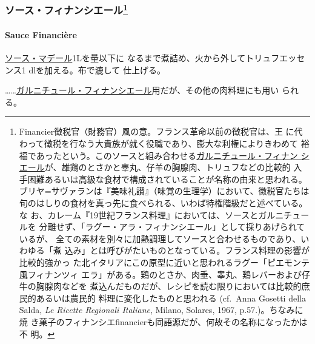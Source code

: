 \hypertarget{ux30bdux30fcux30b9ux30d5ux30a3ux30caux30f3ux30b7ux30a8ux30fcux30eb34}{%
\subsubsection[ソース・フィナンシエール]{\texorpdfstring{ソース・フィナンシエール\footnote{Financier徴税官（財務官）風の意。フランス革命以前の徴税官は、王
  に代わって徴税を行なう大貴族が就く役職であり、膨大な利権によりきわめて
  裕福であったという。このソースと組み合わせる\href{}{ガルニチュール・フィナン
  シエール}が、雄鶏のとさかと睾丸、仔羊の胸腺肉、トリュフなどの比較的
  入手困難あるいは高級な食材で構成されていることが名称の由来と思われる。
  ブリヤ=サヴァランは『美味礼讃』（味覚の生理学）において、徴税官たちは
  旬のはしりの食材を真っ先に食べられる、いわば特権階級だと述べている。な
  お、カレーム『19世紀フランス料理』においては、ソースとガルニチュールを
  分離せず、「ラグー・アラ・フィナンシエール」として採りあげられているが、
  全ての素材を別々に加熱調理してソースと合わせるものであり、いわゆる「煮
  込み」とは呼びがたいものとなっている。フランス料理の影響が比較的強かっ
  た北イタリアにこの原型に近いと思われるラグー「ピエモンテ風フィナンツィ
  エラ」がある。鶏のとさか、肉垂、睾丸、鶏レバーおよび仔牛の胸腺肉などを
  煮込んだものだが、レシピを読む限りにおいては比較的庶民的あるいは農民的
  料理に変化したものと思われる (cf.~Anna Gosetti della Salda, \emph{Le
  Ricette Regionali Italiane}, Milano, Solares, 1967, p.57.)。ちなみに焼
  き菓子のフィナンシエfinancierも同語源だが、何故その名称になったかは不
  明。}}{ソース・フィナンシエール}}\label{ux30bdux30fcux30b9ux30d5ux30a3ux30caux30f3ux30b7ux30a8ux30fcux30eb34}}

\hypertarget{sauce-financiere}{%
\paragraph{Sauce Financière}\label{sauce-financiere}}

  

\protect\hyperlink{sauce-madere}{ソース・マデール}1\unquart{}Lを\troisquarts{}量以下に
なるまで煮詰め、火から外してトリュフエッセンス1 dlを加える。布で漉して
仕上げる。

\ldots{}\ldots{}\href{}{ガルニチュール・フィナンシエール}用だが、その他の肉料理にも用い
られる。

